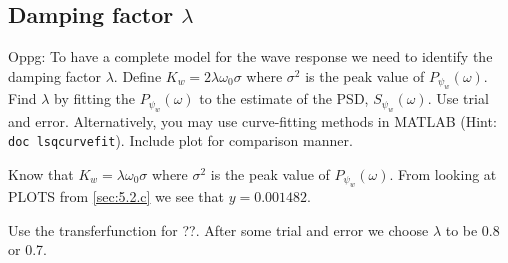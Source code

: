 \subsection{Damping factor $\lambda$} \label{sec:5.2.d}
Oppg: To have a complete model for the wave response we need to identify the damping factor $\lambda$. Define $K_w = 2 \lambda \omega_0 \sigma$ where $\sigma^2$ is the peak value of $P_{\psi_w}(\omega)$. Find $\lambda$ by fitting the $P_{\psi_w}(\omega)$ to the estimate of the PSD, $S_{\psi_w}(\omega)$. Use trial and error. Alternatively, you may use curve-fitting methods in MATLAB (Hint: \texttt{doc lsqcurvefit}). Include plot for comparison manner.
\newline

Know that $K_w = \lambda \omega_0 \sigma$ where $\sigma^2$ is the peak value of $P_{\psi_w}(\omega)$. From looking at PLOTS from \cref{sec:5.2.c} we see that $y = 0.001482$. 

Use the transferfunction for ??. After some trial and error we choose $\lambda$ to be 0.8 or 0.7.

